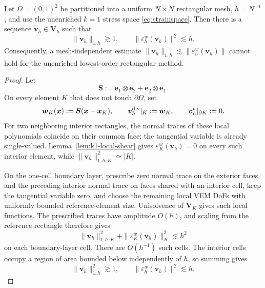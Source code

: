\documentclass[review,hidelinks,onefignum,onetabnum]{siamart251216}
\begin{document}
\begin{proposition}[Boundary-layer shear mode for the unenriched $k=1$ space]
\label{prop:k1-rect-nearkernel}
Let $\Omega=(0,1)^2$ be partitioned into a uniform $N\times N$ rectangular
mesh, $h=N^{-1}$, and use the unenriched $k=1$ stress space
\eqref{eq:strainspace}.  Then there is a sequence
$\boldsymbol v_h\in\boldsymbol V_h$ such that
\[
 \|\boldsymbol v_h\|_{1,h}\gtrsim 1,
 \qquad
 \|\varepsilon_h^w(\boldsymbol v_h)\|^2\lesssim h.
\]
Consequently, a mesh-independent estimate
$\|\boldsymbol v_h\|_{1,h}\lesssim
\|\varepsilon_h^w(\boldsymbol v_h)\|$ cannot hold for the unenriched
lowest-order rectangular method.
\end{proposition}
\begin{proof}
Let
\[
 \boldsymbol S:=\boldsymbol e_1\otimes\boldsymbol e_2+
 \boldsymbol e_2\otimes\boldsymbol e_1.
\]
On every element $K$ that does not touch $\partial\Omega$, set
\[
 \boldsymbol w_K(\boldsymbol x):=
 \boldsymbol S(\boldsymbol x-\boldsymbol x_K),
 \qquad
 \boldsymbol v_h^{\rm div}|_K:=\boldsymbol w_K,
 \qquad
 \boldsymbol v_h^t|_{\partial K}:=0.
\]
For two neighboring interior rectangles, the normal traces of these local
polynomials coincide on their common face; the tangential variable is already
single-valued.  Lemma~\ref{lem:k1-local-shear} gives
$\varepsilon_K^w(\boldsymbol v_h)=0$ on every such interior element, while
$\|\boldsymbol v_h\|_{1,h,K}^2\simeq |K|$.

On the one-cell boundary layer, prescribe zero normal trace on the exterior
faces and the preceding interior normal trace on faces shared with an interior
cell, keep the tangential variable zero, and choose the remaining local VEM
DoFs with uniformly bounded reference-element size.  Unisolvence of
$\boldsymbol V_K$ gives such local functions.  The prescribed traces have
amplitude $O(h)$, and scaling from the reference rectangle therefore gives
\[
 \|\boldsymbol v_h\|_{1,h,K}^2+
 \|\varepsilon_K^w(\boldsymbol v_h)\|_K^2\lesssim h^2
\]
on each boundary-layer cell.  There are $O(h^{-1})$ such cells.  The interior
cells occupy a region of area bounded below independently of $h$, so summing
gives
\[
 \|\boldsymbol v_h\|_{1,h}^2\gtrsim1,
 \qquad
 \|\varepsilon_h^w(\boldsymbol v_h)\|^2\lesssim h.
\]
\end{proof}
\end{document}
